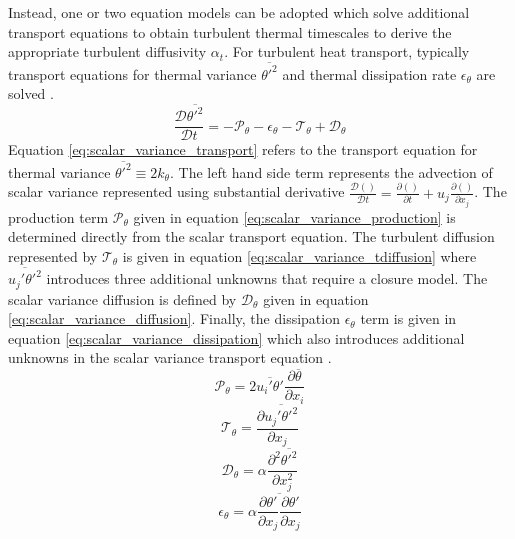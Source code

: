 Instead, one or two equation models can be adopted which solve additional transport equations to obtain turbulent thermal timescales to derive the appropriate turbulent diffusivity $\alpha_{t}$. For turbulent heat transport, typically transport equations for thermal variance $\overline{\theta'^{2}}$ and thermal dissipation rate $\epsilon_{\theta}$ are solved \citep{Yoder2016}.
\begin{equation}
\label{eq:scalar_variance_transport}
\frac{\mathcal{D} \overline{\theta'^{2}}}{\mathcal{D} t} = -\mathcal{P_{\theta}} - \epsilon_{\theta} - \mathcal{T_{\theta}} + \mathcal{D_{\theta}}
\end{equation}
Equation \ref{eq:scalar_variance_transport} refers to the transport equation for thermal variance $\overline{\theta'^{2}} \equiv 2k_{\theta}$. The left hand side term represents the advection of scalar variance represented using substantial derivative $\frac{\mathcal{D} ()}{\mathcal{D} t} = \frac{\partial ()}{\partial t} + u_{j}\frac{\partial ()}{\partial x_{j}}$. The production term $\mathcal{P_{\theta}}$ given in equation \ref{eq:scalar_variance_production} is determined directly from the scalar transport equation. The turbulent diffusion represented by $\mathcal{T_{\theta}}$ is given in equation \ref{eq:scalar_variance_tdiffusion} where $\overline{u_{j}'\theta'^{2}}$ introduces three additional unknowns that require a closure model. The scalar variance diffusion is defined by $\mathcal{D_{\theta}}$ given in equation \ref{eq:scalar_variance_diffusion}. Finally, the dissipation $\epsilon_{\theta}$ term is given in equation \ref{eq:scalar_variance_dissipation} which also introduces additional unknowns in the scalar variance transport equation \cite{Leschziner2015}.
\begin{equation}
\label{eq:scalar_variance_production}
\mathcal{P_{\theta}} = 2\overline{u_{i}'\theta'}\frac{\partial \overline{\theta}}{\partial x_{i}}
\end{equation}
\begin{equation}
\label{eq:scalar_variance_tdiffusion}
\mathcal{T_{\theta}} = \frac{\partial \overline{u_{j}'\theta'^{2}} }{\partial x_{j}}
\end{equation}
\begin{equation}
\label{eq:scalar_variance_diffusion}
\mathcal{D_{\theta}} = \alpha\frac{\partial^{2} \overline{\theta'^{2}}}{\partial x_{j}^{2} }
\end{equation}
\begin{equation}
\label{eq:scalar_variance_dissipation}
\epsilon_{\theta} = \alpha \overline{\frac{\partial \theta'}{\partial x_{j}}\frac{\partial \theta'}{\partial x_{j}}}
\end{equation}
